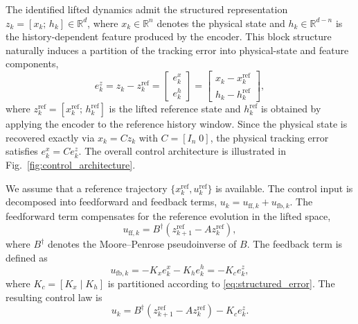 \documentclass[journal]{IEEEtran}
\begin{document}
The identified lifted dynamics admit the structured representation $z_k = [x_k;\, h_k] \in \mathbb{R}^d$, where $x_k \in \mathbb{R}^n$ denotes the physical state and $h_k \in \mathbb{R}^{d-n}$ is the history-dependent feature produced by the encoder. This block structure naturally induces a partition of the tracking error into physical-state and feature components,
\begin{equation}
    e_k^z = z_k - z_k^{\mathrm{ref}}
    = \begin{bmatrix} e_k^x \\ e_k^h \end{bmatrix}
    = \begin{bmatrix} x_k - x_k^{\mathrm{ref}} \\ h_k - h_k^{\mathrm{ref}} \end{bmatrix},
    \label{eq:structured_error}
\end{equation}
where $z_k^{\mathrm{ref}} = [x_k^{\mathrm{ref}};\, h_k^{\mathrm{ref}}]$ is the lifted reference state and $h_k^{\mathrm{ref}}$ is obtained by applying the encoder to the reference history window. Since the physical state is recovered exactly via $x_k = C z_k$ with $C = [I_n\;0]$, the physical tracking error satisfies $e_k^x = C e_k^z$. The overall control architecture is illustrated in Fig.~\ref{fig:control_architecture}.

We assume that a reference trajectory $\{x_k^{\mathrm{ref}}, u_k^{\mathrm{ref}}\}$ is available. The control input is decomposed into feedforward and feedback terms, $u_k = u_{\mathrm{ff},k} + u_{\mathrm{fb},k}$. The feedforward term compensates for the reference evolution in the lifted space,
\begin{equation}
    u_{\mathrm{ff},k} = B^\dagger\!\left(z_{k+1}^{\mathrm{ref}} - A z_k^{\mathrm{ref}}\right),
    \label{eq:feedforward}
\end{equation}
where $B^\dagger$ denotes the Moore--Penrose pseudoinverse of $B$. The feedback term is defined as
\begin{equation}
    u_{\mathrm{fb},k} = -K_x e_k^x - K_h e_k^h = -K_c e_k^z,
    \label{eq:hierarchical_fb}
\end{equation}
where $K_c = [K_x\;|\;K_h]$ is partitioned according to \eqref{eq:structured_error}. The resulting control law is
\begin{equation}
    u_k = B^\dagger\!\left(z_{k+1}^{\mathrm{ref}} - A z_k^{\mathrm{ref}}\right) - K_c e_k^z.
    \label{eq:full_ctrl}
\end{equation}
\end{document}
